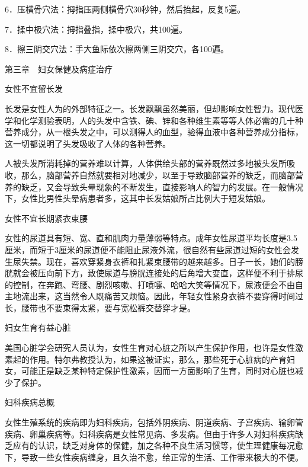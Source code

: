 \documentclass[12pt,UTF8]{ctexbook}
\begin{document}
6．压横骨穴法：拇指压两侧横骨穴30秒钟，然后抬起，反复5遍。

7．揉中极穴法：拇指叠指，揉中极穴，共100遍。

8．擦三阴交穴法：手大鱼际依次擦两侧三阴交穴，各100遍。





第三章　妇女保健及病症治疗


女性不宜留长发


长发是女性人为的外部特征之一。长发飘飘虽然美丽，但却影响女性智力。现代医学和化学测验表明，人的头发中含铁、碘、锌和各种维生素等等人体必需的几十种营养成分，从一根头发之中，可以测得人的血型，验得血液中各种营养成分指标，这一切都说明了头发吸收了人体的各种营养。

人被头发所消耗掉的营养难以计算，人体供给头部的营养既然过多地被头发所吸收，那么，脑部营养自然就要相对地减少，以至于导致脑部营养的缺乏，而脑部营养的缺乏，又会导致头晕现象的不断发生，直接影响人的智力的发展。在一般情况下，女性比男性头晕病患者多，这其中长发姑娘所占比例大于短发姑娘。





女性不宜长期紧衣束腰


女性的尿道具有短、宽、直和肌肉力量薄弱等特点。成年女性尿道平均长度是3.5厘米，而短于3厘米的尿道便不能阻止尿液外流，很自然有些尿道过短的女性会发生尿失禁。现在，喜欢穿紧身衣裤和扎紧束腰带的越来越多。日子一长，她们的膀胱就会被压向前下方，致使尿道与膀胱连接处的后角增大变直，这样便不利于排尿的控制，在奔跑、弯腰、剧烈咳嗽、打喷嚏、哈哈大笑等情况下，尿液便会不由自主地流出来，这当然令人既痛苦又烦恼。因此，年轻女性紧身衣裤不要穿得时间过长，腰带也不要束得太紧，要与宽松裤交替穿才是。





妇女生育有益心脏


美国心脏学会研究人员认为，女性生育对心脏之所以产生保护作用，也许是女性激素起的作用。特尔弗教授认为，如果这被证实，那么，那些死于心脏病的产育妇女，可能正是缺乏某种特定保护性激素，因而一方面影响了生育，同时对心脏也减少了保护。





妇科疾病总概


女性生殖系统的疾病即为妇科疾病，包括外阴疾病、阴道疾病、子宫疾病、输卵管疾病、卵巢疾病等。妇科疾病是女性常见病、多发病。但由于许多人对妇科疾病缺乏应有的认识，缺乏对身体的保健，加之各种不良生活习惯等，使生理健康每况愈下，导致一些女性疾病缠身，且久治不愈，给正常的生活、工作带来极大的不便。
\end{document}
